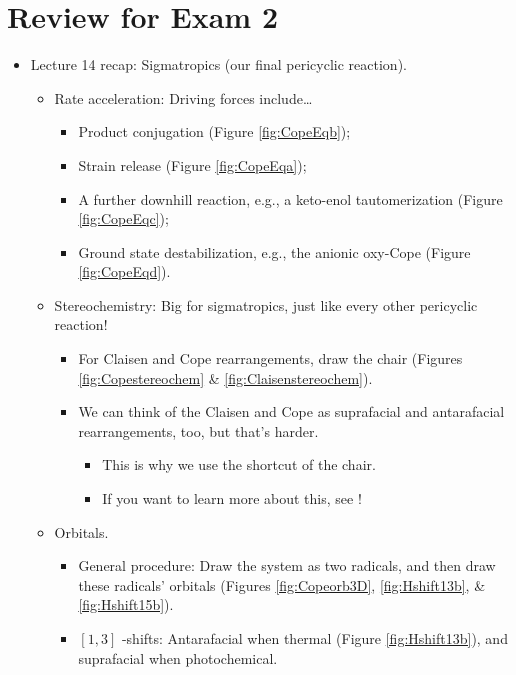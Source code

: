 \documentclass[../notes.tex]{subfiles}
\begin{document}
\section{Review for Exam 2}
\begin{itemize}
    \item {}Lecture 14 recap: Sigmatropics (our final pericyclic reaction).
    \begin{itemize}
        \item Rate acceleration: Driving forces include\dots
        \begin{itemize}
            \item Product conjugation (Figure \ref{fig:CopeEqb});
            \item Strain release (Figure \ref{fig:CopeEqa});
            \item A further downhill reaction, e.g., a keto-enol tautomerization (Figure \ref{fig:CopeEqc});
            \item Ground state destabilization, e.g., the anionic oxy-Cope (Figure \ref{fig:CopeEqd}).
        \end{itemize}
        \item Stereochemistry: Big for sigmatropics, just like every other pericyclic reaction!
        \begin{itemize}
            \item For Claisen and Cope rearrangements, draw the chair (Figures \ref{fig:Copestereochem} \& \ref{fig:Claisenstereochem}).
            \item We can think of the Claisen and Cope as suprafacial and antarafacial rearrangements, too, but that's harder.
            \begin{itemize}
                \item This is why we use the shortcut of the chair.
                \item If you want to learn more about this, see \textcite{bib:Clayden}!
            \end{itemize}
        \end{itemize}
        \pagebreak
        \item Orbitals.
        \begin{itemize}
            \item General procedure: Draw the system as two radicals, and then draw these radicals' orbitals (Figures \ref{fig:Copeorb3D}, \ref{fig:Hshift13b}, \& \ref{fig:Hshift15b}).
            \item $[1,3]$ -shifts: Antarafacial when thermal (Figure \ref{fig:Hshift13b}), and suprafacial when photochemical.

\end{itemize}
\end{itemize}
\end{itemize}
\end{document}
